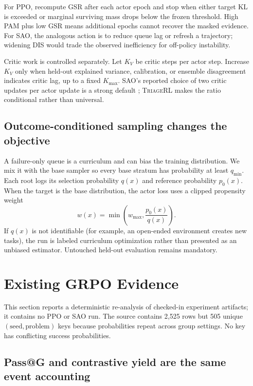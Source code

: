 \documentclass{article}
\newcommand{\method}{\textsc{TriageRL}\xspace}
\begin{document}
For PPO, recompute GSR after each actor epoch and stop when either target KL is
exceeded or marginal surviving mass drops below the frozen threshold.  High
PAM plus low GSR means additional epochs cannot recover the masked evidence.
For SAO, the analogous action is to reduce queue lag or refresh a trajectory;
widening DIS would trade the observed inefficiency for off-policy instability.

Critic work is controlled separately.  Let $K_V$ be critic steps per actor
step.  Increase $K_V$ only when held-out explained variance, calibration, or
ensemble disagreement indicates critic lag, up to a fixed $K_{\max}$.  SAO's
reported choice of two critic updates per actor update is a strong default
\citep{hou2026sao}; \method makes the ratio conditional rather than universal.

\subsection{Outcome-conditioned sampling changes the objective}

A failure-only queue is a curriculum and can bias the training distribution.
We mix it with the base sampler so every base stratum has probability at least
$q_{\min}$.  Each root logs its selection probability $q(x)$ and reference
probability $p_0(x)$.  When the target is the base distribution, the actor loss
uses a clipped propensity weight
\begin{equation}
  w(x)=\min\!\left(w_{\max},\frac{p_0(x)}{q(x)}\right).
  \label{eq:propensity}
\end{equation}
If $q(x)$ is not identifiable (for example, an open-ended environment creates
new tasks), the run is labeled curriculum optimization rather than presented
as an unbiased estimator.  Untouched held-out evaluation remains mandatory.

\section{Existing GRPO Evidence}
\label{sec:evidence}

This section reports a deterministic re-analysis of checked-in experiment
artifacts; it contains no PPO or SAO run.  The source contains 2,525 rows but
505 unique $(\text{seed},\text{problem})$ keys because probabilities repeat
across group settings.  No key has conflicting success probabilities.

\subsection{Pass@G and contrastive yield are the same event accounting}
\end{document}
